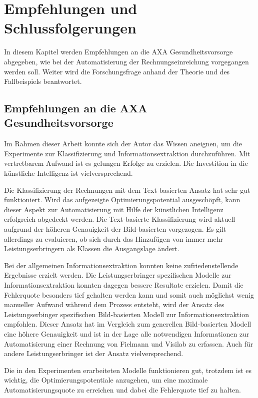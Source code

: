 \cleardoublepage
\section{Empfehlungen und Schlussfolgerungen}
\label{chap:summary}

In diesem Kapitel werden Empfehlungen an die AXA Gesundheitsvorsorge abgegeben, wie bei der Automatisierung der Rechnungseinreichung vorgegangen werden soll. Weiter wird die Forschungsfrage anhand der Theorie und des Fallbeispiels beantwortet.

\subsection{Empfehlungen an die AXA Gesundheitsvorsorge}

Im Rahmen dieser Arbeit konnte sich der Autor das Wissen aneignen, um die Experimente zur Klassifizierung und Informationsextraktion durchzuführen. Mit vertretbarem Aufwand ist es gelungen Erfolge zu erzielen. Die Investition in die künstliche Intelligenz ist vielversprechend.

Die Klassifizierung der Rechnungen mit dem Text-basierten Ansatz hat sehr gut funktioniert. Wird das aufgezeigte Optimierungspotential ausgeschöpft, kann dieser Aspekt zur Automatisierung mit Hilfe der künstlichen Intelligenz erfolgreich abgedeckt werden. Die Text-basierte Klassifizierung wird aktuell aufgrund der höheren Genauigkeit der Bild-basierten vorgezogen. Es gilt allerdings zu evaluieren, ob sich durch das Hinzufügen von immer mehr Leistungserbringern als Klassen die Ausgangslage ändert.

Bei der allgemeinen Informationsextraktion konnten keine zufriedenstellende Ergebnisse erzielt werden. Die Leistungserbringer spezifischen Modelle zur Informationsextraktion konnten dagegen bessere Resultate erzielen. Damit die Fehlerquote besonders tief gehalten werden kann und somit auch möglichst wenig manueller Aufwand während dem Prozess entsteht, wird der Ansatz des Leistungserbinger spezifischen Bild-basierten Modell zur Informationsextraktion empfohlen. Dieser Ansatz hat im Vergleich zum generellen Bild-basierten Modell eine höhere Genauigkeit und ist in der Lage alle notwendigen Informationen zur Automatisierung einer Rechnung von Fielmann und Visilab zu erfassen. Auch für andere Leistungserbringer ist der Ansatz vielversprechend.

Die in den Experimenten erarbeiteten Modelle funktionieren gut, trotzdem ist es wichtig, die Optimierungspotentiale anzugehen, um eine maximale Automatisierungsquote zu erreichen und dabei die Fehlerquote tief zu halten.

